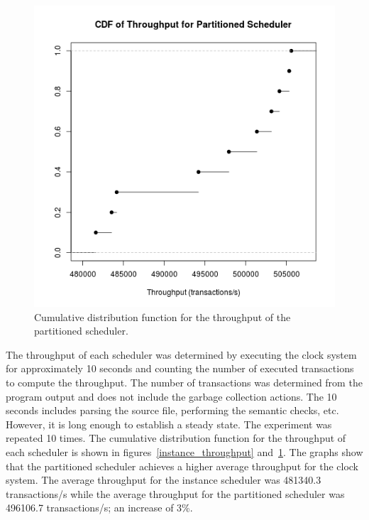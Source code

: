 \begin{figure}
\center
\includegraphics[width=\textwidth]{partitioned_throughput_cdf.png}
\caption{Cumulative distribution function for the throughput of the partitioned scheduler. \label{partitioned_throughput}}
\end{figure}

The throughput of each scheduler was determined by executing the clock system for approximately 10 seconds and counting the number of executed transactions to compute the throughput.
The number of transactions was determined from the program output and does not include the garbage collection actions.
The 10 seconds includes parsing the source file, performing the semantic checks, etc.
However, it is long enough to establish a steady state.
The experiment was repeated 10 times.
The cumulative distribution function for the throughput of each scheduler is shown in figures~\ref{instance_throughput} and~\ref{partitioned_throughput}.
The graphs show that the partitioned scheduler achieves a higher average throughput for the clock system.
The average throughput for the instance scheduler was 481340.3 transactions/s while the average throughput for the partitioned scheduler was 496106.7 transactions/s; an increase of 3\%.

